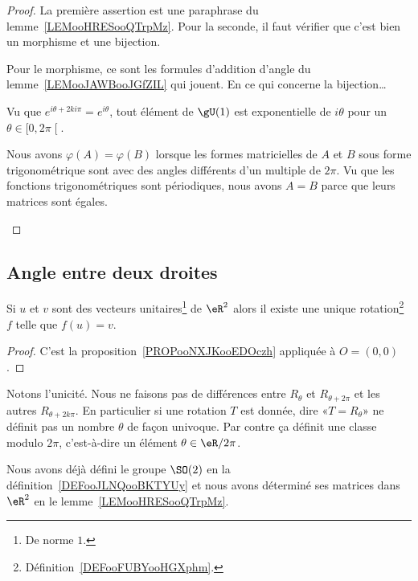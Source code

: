 \begin{proof}
    La première assertion est une paraphrase du lemme~\ref{LEMooHRESooQTrpMz}. Pour la seconde, il faut vérifier que c'est bien un morphisme et une bijection.

    Pour le morphisme, ce sont les formules d'addition d'angle du lemme~\ref{LEMooJAWBooJGfZIL} qui jouent. En ce qui concerne la bijection\ldots

    \begin{subproof}
        \item[Surjection]
            Vu que \(  e^{i\theta+2ki\pi}= e^{i\theta}\), tout élément de \( \gU(1)\) est exponentielle de \( i\theta\) pour un \( \theta\in\mathopen[ 0 , 2\pi \mathclose[\).
        \item[Injection]
            Nous avons \( \varphi(A)=\varphi(B)\) lorsque les formes matricielles de \( A\) et \( B\) sous forme trigonométrique sont avec des angles différents d'un multiple de \( 2\pi\). Vu que les fonctions trigonométriques sont périodiques, nous avons \( A=B\) parce que leurs matrices sont égales.
    \end{subproof}
\end{proof}

\subsection{Angle entre deux droites}

\begin{proposition}      \label{PROPooDWIMooQPkobw}
    Si \( u\) et \( v\) sont des vecteurs unitaires\footnote{De norme \( 1\).} de \( \eR^2\) alors il existe une unique rotation\footnote{Définition~\ref{DEFooFUBYooHGXphm}.} \( f\) telle que \( f(u)=v\).
\end{proposition}

\begin{proof}
    C'est la proposition~\ref{PROPooNXJKooEDOczh} appliquée à \( O=(0,0)\).
\end{proof}

\begin{remark}
    Notons l'unicité. Nous ne faisons pas de différences entre \( R_{\theta}\) et \( R_{\theta+2\pi}\) et les autres \( R_{\theta+2k\pi}\). En particulier si une rotation \( T\) est donnée, dire «\( T=R_{\theta}\)» ne définit pas un nombre \( \theta\) de façon univoque. Par contre ça définit une classe modulo \( 2\pi\), c'est-à-dire un élément \( \theta\in \eR/2\pi\).

    Nous avons déjà défini le groupe \( \SO(2)\) en la définition~\ref{DEFooJLNQooBKTYUy} et nous avons déterminé ses matrices dans \( \eR^2\) en le lemme~\ref{LEMooHRESooQTrpMz}.
\end{remark}

